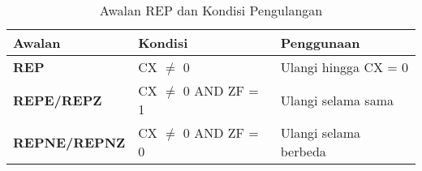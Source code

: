 \documentclass[../main.tex]{subfiles}
\begin{document}
                \begin{table}[H]
                    \centering
                    \caption{Awalan REP dan Kondisi Pengulangan}
                    \begin{tabular}{|p{2.5cm}|p{4cm}|p{6cm}|}
                        \hline
                        \textbf{Awalan} & \textbf{Kondisi} & \textbf{Penggunaan} \\
                        \hline
                        \textbf{REP} & CX $\neq$ 0 & Ulangi hingga CX = 0 \\
                        \hline
                        \textbf{REPE/REPZ} & CX $\neq$ 0 AND ZF = 1 & Ulangi selama sama \\
                        \hline
                        \textbf{REPNE/REPNZ} & CX $\neq$ 0 AND ZF = 0 & Ulangi selama berbeda \\
                        \hline
                    \end{tabular}
                    \label{tab:rep-prefixes}
                \end{table}
\end{document}
